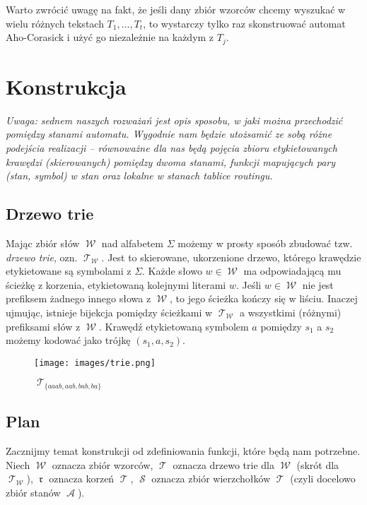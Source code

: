 \documentclass{article}
\DeclareMathOperator{\rot}{\mathfrak{r}}
\DeclareMathOperator{\W}{\mathcal{W}}
\DeclareMathOperator{\A}{\mathcal{A}}
\DeclareMathOperator{\states}{\mathcal{S}}
\DeclareMathOperator{\trie}{\mathcal{T}}
\begin{document}
Warto zwrócić uwagę na fakt, że jeśli dany zbiór wzorców chcemy wyszukać w wielu różnych tekstach $T_1,...,T_t$, to wystarczy tylko raz skonstruować automat Aho-Corasick i użyć go niezależnie na każdym z $T_j$.

\section{Konstrukcja}
\textit{Uwaga: sednem naszych rozważań jest opis sposobu, w jaki można przechodzić pomiędzy stanami automatu. Wygodnie nam będzie utożsamić ze sobą różne podejścia realizacji -- równoważne dla nas będą pojęcia zbioru etykietowanych krawędzi (skierowanych) pomiędzy dwoma stanami, funkcji mapujących pary (stan, symbol) w stan oraz lokalne w stanach tablice routingu.}

\subsection{Drzewo trie}
Mając zbiór słów $\W$ nad alfabetem $\Sigma$ możemy w prosty sposób zbudować tzw. \textit{drzewo trie}, ozn. $\trie_{\W}$. Jest to skierowane, ukorzenione drzewo, którego krawędzie etykietowane są symbolami z $\Sigma$. Każde słowo $w\in\W$ ma odpowiadającą mu ścieżkę z korzenia, etykietowaną kolejnymi literami $w$. Jeśli $w\in\W$ nie jest prefiksem żadnego innego słowa z $\W$, to jego ścieżka kończy się w liściu. Inaczej ujmując, istnieje bijekcja pomiędzy ścieżkami w $\trie_{\W}$ a wszystkimi (różnymi) prefiksami słów z $\W$. Krawędź etykietowaną symbolem $a$ pomiędzy $s_1$ a $s_2$ możemy kodować jako trójkę $(s_1, a, s_2)$.

\begin{figure}[h!]
    \centering
    \texttt{[image: images/trie.png]}
    \caption{$\trie_{\{aaab, aab, bab, ba\}}$}
    \label{fig:trie}
\end{figure}

\subsection{Plan}
Zacznijmy temat konstrukcji od zdefiniowania funkcji, które będą nam potrzebne. Niech $\W$ oznacza zbiór wzorców, $\trie$ oznacza drzewo trie dla $\W$ (skrót dla $\trie_{\W}$), $\rot$ oznacza korzeń $\trie$, $\states$ oznacza zbiór wierzchołków $\trie$ (czyli docelowo zbiór stanów $\A$).
\end{document}
